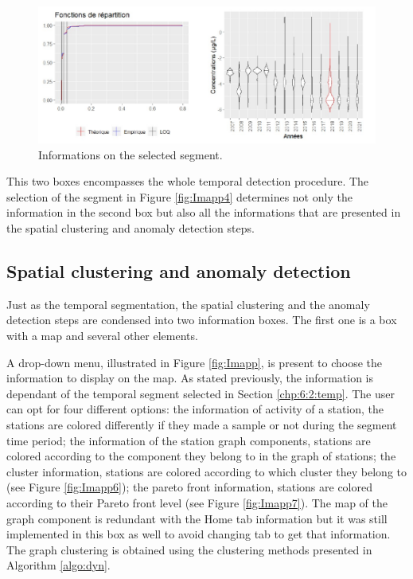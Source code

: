\begin{figure}[htbp]
  \centering
  \includegraphics[]{figs/Chap6/Im_appbis5.pdf}
  \caption{Informations on the selected segment.}
  \label{fig:Imapp5}
\end{figure}

This two boxes encompasses the whole temporal detection procedure. The selection of the segment in Figure \ref{fig:Imapp4} determines not only the information in the second box but also all the informations that are presented in the spatial clustering and anomaly detection steps.

\subsection{Spatial clustering and anomaly detection}

Just as the temporal segmentation, the spatial clustering and the anomaly detection steps are condensed into two information boxes. The first one is a box with a map and several other elements. 

A drop-down menu, illustrated in Figure \ref{fig:Imapp}, is present to choose the information to display on the map. As stated previously, the information is dependant of the temporal segment selected in Section \ref{chp:6:2:temp}. The user can opt for four different options: the information of activity of a station, the stations are colored differently if they made a sample or not during the segment time period; the information of the station graph components, stations are colored according to the component they belong to in the graph of stations; the cluster information, stations are colored according to which cluster they belong to (see Figure \ref{fig:Imapp6}); the pareto front information, stations are colored according to their Pareto front level (see Figure \ref{fig:Imapp7}). The map of the graph component is redundant with the Home tab information but it was still implemented in this box as well to avoid changing tab to get that information. The graph clustering is obtained using the clustering methods presented in Algorithm \ref{algo:dyn}.  
   
